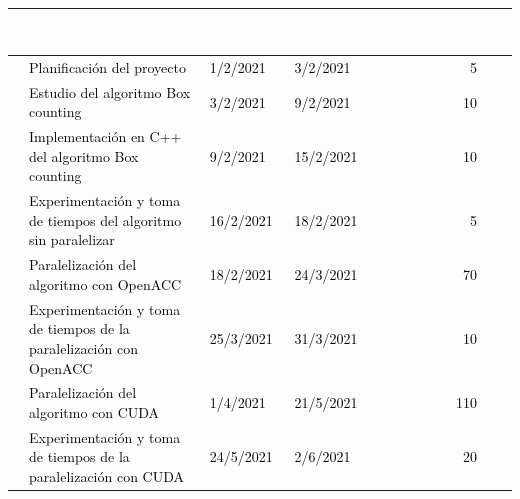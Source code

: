 \begin{table}[H]
    \centering
    \begin{adjustbox}{max height=\textheight, max width=\textwidth}
    \begin{tabular}{|clllrrl|} 
    \hline
    \rowcolor{black} \multicolumn{1}{|l}{}  & \textcolor{white}{Tareas} & \textcolor{white}{Fecha de inicio}         & \textcolor{white}{Fecha de finalización} & \textcolor{white}{Horas estimadas}&\\                                      
    \hline
    \rowcolor{white} \multicolumn{1}{|l}{}  & \textcolor{black}{Planificación del proyecto} & \textcolor{black}{1/2/2021}         & \textcolor{black}{3/2/2021} & \textcolor{black}{5}&\\
    \hline
    \rowcolor{white} \multicolumn{1}{|l}{}  & \textcolor{black}{Estudio del algoritmo Box counting} & \textcolor{black}{3/2/2021}         & \textcolor{black}{9/2/2021} & \textcolor{black}{10}&\\  
    \hline
    \rowcolor{white} \multicolumn{1}{|l}{}  & \textcolor{black}{Implementación en C++ del algoritmo Box counting} & \textcolor{black}{9/2/2021}         & \textcolor{black}{15/2/2021} & \textcolor{black}{10}\\
    \hline
    \rowcolor{white} \multicolumn{1}{|l}{}  & \textcolor{black}{Experimentación y toma de tiempos del algoritmo sin paralelizar} & \textcolor{black}{16/2/2021}         & \textcolor{black}{18/2/2021} &\textcolor{black}{5}&\\
    \hline
    \rowcolor{white} \multicolumn{1}{|l}{}  & \textcolor{black}{Paralelización del algoritmo con OpenACC} & \textcolor{black}{18/2/2021}         & \textcolor{black}{24/3/2021} &\textcolor{black}{70}\\
    \hline
    \rowcolor{white} \multicolumn{1}{|l}{}  & \textcolor{black}{Experimentación y toma de tiempos de la paralelización con OpenACC} & \textcolor{black}{25/3/2021}         & \textcolor{black}{31/3/2021} &\textcolor{black}{10}\\
    \hline
    \rowcolor{white} \multicolumn{1}{|l}{}  & \textcolor{black}{Paralelización del algoritmo con CUDA} & \textcolor{black}{1/4/2021}         & \textcolor{black}{21/5/2021} &\textcolor{black}{110}\\
    \hline
    \rowcolor{white} \multicolumn{1}{|l}{}  & \textcolor{black}{Experimentación y toma de tiempos de la paralelización con CUDA} & \textcolor{black}{24/5/2021}         & \textcolor{black}{2/6/2021} &\textcolor{black}{20}\\

\end{tabular}
\end{adjustbox}
\end{table}
